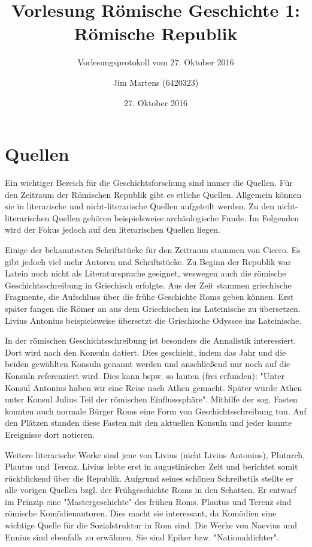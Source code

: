 \documentclass[10pt,a4paper,oneside,ngerman,numbers=noenddot]{scrartcl}
\begin{document}
\author{Jim Martens (6420323)}
\title{Vorlesung Römische Geschichte 1: Römische Republik}
\subtitle{Vorlesungsprotokoll vom 27. Oktober 2016}
\date{27. Oktober 2016}
\maketitle

\section*{Quellen}

Ein wichtiger Bereich für die Geschichtsforschung sind immer die Quellen. Für den Zeitraum der Römischen Republik gibt
es etliche Quellen. Allgemein können sie in literarische und nicht-literarische Quellen aufgeteilt werden. Zu den nicht-literarischen
Quellen gehören beispielsweise archäologische Funde. Im Folgenden wird der Fokus jedoch auf den literarischen Quellen liegen.

Einige der bekanntesten Schriftstücke für den Zeitraum stammen von Cicero. Es gibt jedoch viel mehr Autoren und Schriftstücke.
Zu Beginn der Republik war Latein noch nicht als Literatursprache geeignet, weswegen auch die römische Geschichtsschreibung in
Griechisch erfolgte. Aus der Zeit stammen griechische Fragmente, die Aufschluss über die frühe Geschichte Roms geben können.
Erst später fangen die Römer an aus dem Griechischen ins Lateinische zu übersetzen. Livius Antonius beispielsweise übersetzt
die Griechische Odyssee ins Lateinische.

In der römischen Geschichtsschreibung ist besonders die Annalistik interessiert. Dort wird nach den Konsuln datiert. Dies geschieht,
indem das Jahr und die beiden gewählten Konsuln genannt werden und anschließend nur noch auf die Konsuln referenziert wird.
Dies kann bspw. so lauten (frei erfunden): "Unter Konsul Antonius haben wir eine Reise nach Athen gemacht. Später wurde Athen unter
Konsul Julius Teil der römischen Einflusssphäre". Mithilfe der sog. Fasten konnten auch normale Bürger Roms eine Form von
Geschichtsschreibung tun. Auf den Plätzen standen diese Fasten mit den aktuellen Konsuln und jeder konnte Ereignisse dort notieren.

Weitere literarische Werke sind jene von Livius (nicht Livius Antonius), Plutarch, Plautus und Terenz. Livius lebte erst in augustinischer
Zeit und berichtet somit rückblickend über die Republik. Aufgrund seines schönen Schreibstils stellte er alle vorigen Quellen bzgl.
der Frühgeschichte Roms in den Schatten. Er entwarf im Prinzip eine "Mastergeschichte" des frühen Roms. Plautus und Terenz sind
römische Komödienautoren. Dies macht sie interessant, da Komödien eine wichtige Quelle für die Sozialstruktur in Rom sind. Die Werke
von Naevius und Ennius sind ebenfalls zu erwähnen. Sie sind Epiker bzw. "Nationaldichter".
\end{document}

